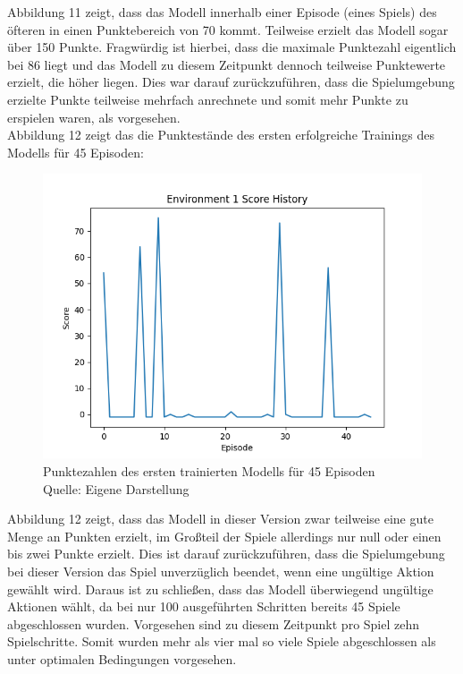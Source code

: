 Abbildung 11 zeigt, dass das Modell innerhalb einer Episode (eines Spiels) des öfteren in einen Punktebereich von 70 kommt. Teilweise erzielt das Modell sogar über 150 Punkte. Fragwürdig ist hierbei, dass die maximale Punktezahl eigentlich bei 86 liegt und das Modell zu diesem Zeitpunkt dennoch teilweise Punktewerte erzielt, die höher liegen. Dies war darauf zurückzuführen, dass die Spielumgebung erzielte Punkte teilweise mehrfach anrechnete und somit mehr Punkte zu erspielen waren, als vorgesehen.\\

Abbildung 12 zeigt das die Punktestände des ersten erfolgreiche Trainings des Modells für 45 Episoden:
\nopagebreak
\begin{figure}[H]
	\includegraphics[width=1\textwidth]{Bilder/firstpropertraining100steps} 
	\caption[Punktezahlen des ersten trainierten Modells für 45 Episoden]{Punktezahlen des ersten trainierten Modells für 45 Episoden\\ Quelle: Eigene Darstellung}
\end{figure}

Abbildung 12 zeigt, dass das Modell in dieser Version zwar teilweise eine gute Menge an Punkten erzielt, im Großteil der Spiele allerdings nur null oder einen bis zwei Punkte erzielt. Dies ist darauf zurückzuführen, dass die Spielumgebung bei dieser Version das Spiel unverzüglich beendet, wenn eine ungültige Aktion gewählt wird. Daraus ist zu schließen, dass das Modell überwiegend ungültige Aktionen wählt, da bei nur 100 ausgeführten Schritten bereits 45 Spiele abgeschlossen wurden. Vorgesehen sind zu diesem Zeitpunkt pro Spiel zehn Spielschritte. Somit wurden mehr als vier mal so viele Spiele abgeschlossen als unter optimalen Bedingungen vorgesehen.
